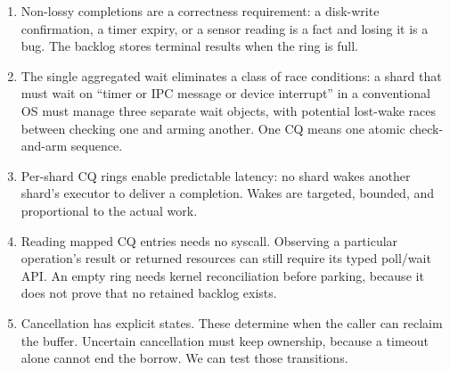 \begin{enumerate}
    \item Non-lossy completions are a correctness requirement: a disk-write
        confirmation, a timer expiry, or a sensor reading is a fact and losing it
        is a bug. The backlog stores terminal results when the ring is full.

    \item The single aggregated wait eliminates a class of race conditions:
        a shard that must wait on ``timer or IPC message or device interrupt'' in
        a conventional OS must manage three separate wait objects, with potential
        lost-wake races between checking one and arming another. One CQ means one
        atomic check-and-arm sequence.

    \item Per-shard CQ rings enable predictable latency: no shard wakes
        another shard's executor to deliver a completion. Wakes are targeted,
        bounded, and proportional to the actual work.

    \item Reading mapped CQ entries needs no syscall. Observing a particular
        operation's result or returned resources can still require its typed
        poll/wait API. An empty ring needs kernel reconciliation before parking, because
        it does not prove that no retained backlog exists.

    \item Cancellation has explicit states. These determine when the caller
        can reclaim the buffer. Uncertain cancellation must keep ownership, because
        a timeout alone cannot end the borrow. We can test those transitions.
\end{enumerate}

\endinput
